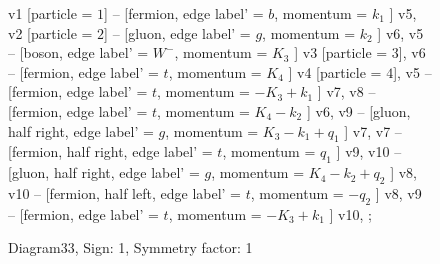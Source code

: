 \documentclass{revtex4}
\begin{document}
\begin{figure}[!htb]
\begin{center}
{    %
v1 [particle = \(1\)] -- [fermion, edge label' = \(b\), momentum = \(k_{1}\) ] v5, 
v2 [particle = \(2\)] -- [gluon, edge label' = \(g\), momentum = \(k_{2}\) ] v6, 
v5 -- [boson, edge label' = \(W^{-}\), momentum = \(K_{3}\) ] v3 [particle = \(3\)], 
v6 -- [fermion, edge label' = \(t\), momentum = \(K_{4}\) ] v4 [particle = \(4\)], 
v5 -- [fermion, edge label' = \(t\), momentum = \(-K_{3} + k_{1}\) ] v7, 
v8 -- [fermion, edge label' = \(t\), momentum = \(K_{4} - k_{2}\) ] v6, 
v9 -- [gluon, half right, edge label' = \(g\), momentum = \(K_{3} - k_{1} + q_{1}\) ] v7, 
v7 -- [fermion, half right, edge label' = \(t\), momentum = \(q_{1}\) ] v9, 
v10 -- [gluon, half right, edge label' = \(g\), momentum = \(K_{4} - k_{2} + q_{2}\) ] v8, 
v10 -- [fermion, half left, edge label' = \(t\), momentum = \(-q_{2}\) ] v8, 
v9 -- [fermion, edge label' = \(t\), momentum = \(-K_{3} + k_{1}\) ] v10, 
};
\end{center}
\caption{Diagram33, Sign: 1, Symmetry factor: 1}
\end{figure}
\newpage
\end{document}

